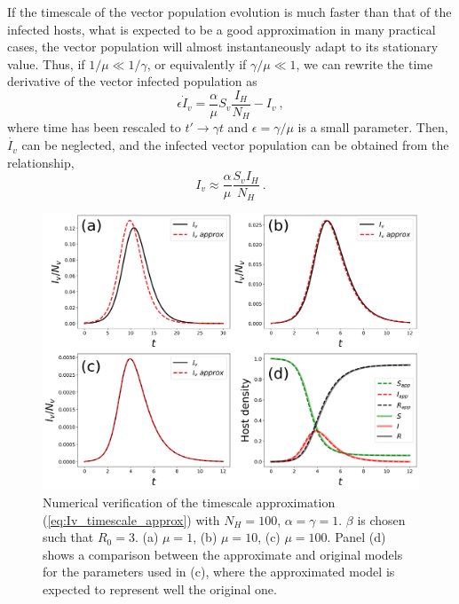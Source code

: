 If the timescale of the vector population evolution is much faster than
that of the infected hosts, what is expected to be a good approximation in many
practical cases, the vector population will almost instantaneously adapt to its
stationary value. Thus, if $1/\mu\ll1/\gamma$, or equivalently if
$\gamma/\mu\ll1$, we can rewrite the time derivative of the vector infected
population as
\begin{equation}
    \epsilon\dot{I}_v=\frac{\alpha}{\mu}S_v\frac{I_H}{N_H} - I_v \ ,
\end{equation}
where time has been rescaled to $t'\to\gamma t$ and $\epsilon=\gamma/\mu$
is a small parameter. Then, $\dot{I_v}$ can be neglected, and the infected
vector population can be obtained from the relationship,
\begin{equation}\label{eq:Iv_timescale_approx}
    I_v\approx\frac{\alpha}{\mu}\frac{S_v I_H}{N_H} \ .
\end{equation}

\begin{figure}[H]
    \centering
    \includegraphics[width=1\textwidth]{Figures/Timescale_approx.pdf}
    \caption[Numerical verification of the timescale approximation]{Numerical
        verification of the timescale approximation
        (\cref{eq:Iv_timescale_approx}) with $N_H=100$, $\alpha=\gamma=1$.
        $\beta$ is chosen such that $R_0=3$. (a) $\mu=1$, (b) $\mu=10$, (c)
        $\mu=100$. Panel (d) shows a comparison between the approximate and
        original models for the parameters used in (c), where the approximated
        model is expected to represent well the original one.}
    \label{fig:timescale_approx}
\end{figure}

